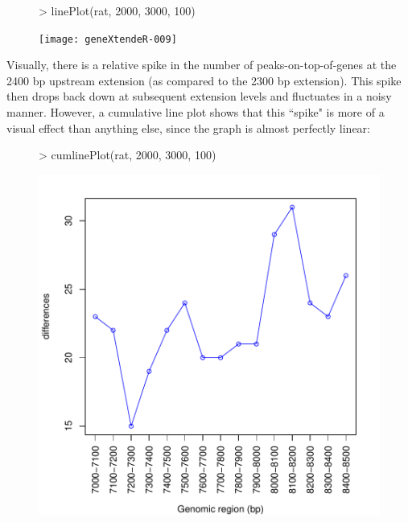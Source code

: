\documentclass[12pt]{article}
\begin{document}
\begin{figure}[H]
\begin{center}
\begin{Schunk}
\begin{Sinput}
> linePlot(rat, 2000, 3000, 100)
\end{Sinput}
\end{Schunk}
\texttt{[image: geneXtendeR-009]}
\end{center}
\end{figure}

Visually, there is a relative spike in the number of peaks-on-top-of-genes at the 2400 bp upstream extension (as compared to the 2300 bp extension).  This spike then drops back down at subsequent extension levels and fluctuates in a noisy manner.  However, a cumulative line plot shows that this ``spike" is more of a visual effect than anything else, since the graph is almost perfectly linear:

\begin{figure}[H]
\begin{center}
\begin{Schunk}
\begin{Sinput}
> cumlinePlot(rat, 2000, 3000, 100)
\end{Sinput}
\end{Schunk}
\includegraphics{geneXtendeR-010}
\end{center}
\end{figure}
\end{document}
